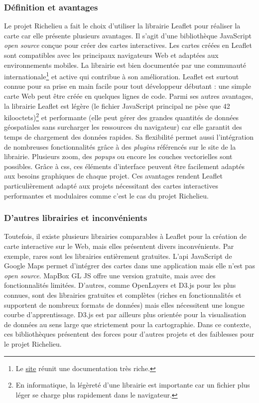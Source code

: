 \subsubsection{Définition et avantages}
Le projet Richelieu a fait le choix d'utiliser la librairie Leaflet pour réaliser la carte car elle présente plusieurs avantages. Il s'agit d'une bibliothèque JavaScript \textit{open source} conçue pour créer des cartes interactives. Les cartes créées en Leaflet sont compatibles avec les principaux navigateurs Web et adaptées aux environnements mobiles. La librairie est bien documentée par une communauté internationale\footnote{Le \href{https://leafletjs.com/plugins.html}{site} réunit une documentation très riche.} et active qui contribue à son amélioration. Leaflet est surtout connue pour sa prise en main facile pour tout développeur débutant : une simple carte Web peut être créée en quelques lignes de code. Parmi ses autres avantages, la librairie Leaflet est légère (le fichier JavaScript principal ne pèse que 42 kilooctets)\footnote{En informatique, la légèreté d'une librairie est importante car un fichier plus léger se charge plus rapidement dans le navigateur.} et performante (elle peut gérer des grandes quantités de données géospatiales sans surcharger les ressources du navigateur) car elle garantit des temps de chargement des données rapides. Sa flexibilité permet aussi l'intégration de nombreuses fonctionnalités grâce à des \textit{plugins} référencés sur le site de la librairie. Plusieurs zoom, des \textit{popups} ou encore les couches vectorielles sont possibles. Grâce à \acrshort{css}, ces éléments d'interface peuvent être facilement adaptés aux besoins graphiques de chaque projet. Ces avantages rendent Leaflet particulièrement adapté aux projets nécessitant des cartes interactives performantes et modulaires comme c'est le cas du projet Richelieu. 

\subsubsection{D'autres librairies et inconvénients}
Toutefois, il existe plusieurs librairies comparables à Leaflet pour la création de carte interactive sur le Web, mais elles présentent divers inconvénients. Par exemple, rares sont les librairies entièrement gratuites. L'\acrshort{api} JavaScript de Google Maps permet d'intégrer des cartes dans une application mais elle n'est pas \textit{open source}. MapBox GL JS offre une version gratuite, mais avec des fonctionnalités limitées. D'autres, comme OpenLayers et D3.js pour les plus connues, sont des librairies gratuites et complètes (riches en fonctionnalités et supportent de nombreux formats de données) mais elles nécessitent une longue courbe d'apprentissage. D3.js est par ailleurs plus orientée pour la visualisation de données au sens large que strictement pour la cartographie. Dans ce contexte, ces bibliothèques présentent des forces pour d'autres projets et des faiblesses pour le projet Richelieu.

